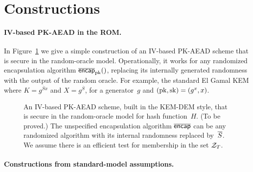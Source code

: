 \section{Constructions}
\label{sec:constructions}
\paragraph{IV-based PK-AEAD in the ROM. }
In Figure~\ref{fig:ro-kem-dem-construction} we give a simple construction of an IV-based PK-AEAD scheme that is secure  in the random-oracle model.   Operationally, it works for any randomized encapsulation algorithm $\OLencapprim{\pk}{}$, replacing its internally generated randomness with the output of the random oracle.  For example, the standard El Gamal KEM where $K=g^{\overline{S}x}$ and $X=g^{\overline{S}}$, for a generator~$g$ and $(\mathrm{pk},\mathrm{sk})=(g^x,x)$.


\begin{figure}[tbhp]
\begin{center}

\medskip
\hspace*{.5ex} 
\caption{An IV-based PK-AEAD scheme, built in the KEM-DEM style,  that is secure in the random-oracle model for hash function~$H$. (To be proved.)  The unspecified encapsulation algorithm $\overline{\mathsf{encap}}$ can be any randomized algorithm with its internal randomness replaced by~$\overline{S}$.  We assume there is an efficient test for membership in the set $\mathcal{Z}_T$.
}
\label{fig:ro-kem-dem-construction}
\end{center}
\end{figure}

\paragraph{Constructions from standard-model assumptions. } 


